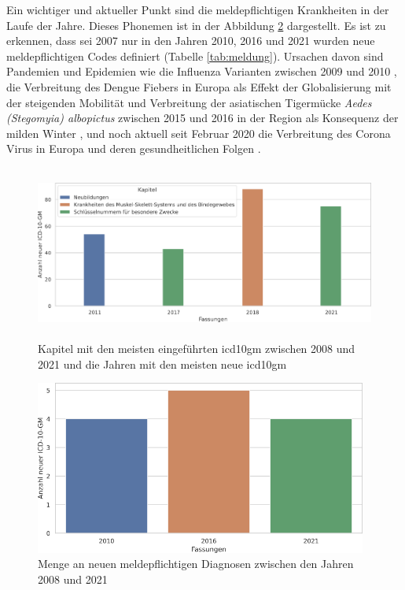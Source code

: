 Ein wichtiger und aktueller Punkt sind die meldepflichtigen Krankheiten in der Laufe der Jahre. Dieses Phonemen ist in der Abbildung \ref{fig:newicdmeld} dargestellt. Es ist zu erkennen, dass sei 2007 nur in den Jahren 2010, 2016 und 2021 wurden neue meldepflichtigen Codes definiert (Tabelle \ref{tab:meldung}). Ursachen davon sind Pandemien und Epidemien wie die Influenza Varianten zwischen 2009 und 2010 \cite{influenza1, influenza2}, die Verbreitung des Dengue Fiebers in Europa als Effekt der Globalisierung mit der steigenden Mobilität \cite{denge1} und Verbreitung der asiatischen Tigermücke \textsl{Aedes (Stegomyia) albopictus} zwischen 2015 und 2016 in der Region als Konsequenz der milden Winter \cite{denge2}, und noch aktuell seit Februar 2020 die Verbreitung des Corona Virus in Europa \cite{corona1} und deren gesundheitlichen Folgen \cite{corona2}.

\clearpage

\begin{figure}[ht]
	\centering
	\includegraphics[height=5.7cm]{figures/kaptnrYear}
	\caption[Kapitel mit den meisten eingeführten \acs{icd10gm} (2008 - 2021)]{Kapitel mit den meisten eingeführten \ac{icd10gm} zwischen 2008 und 2021 und die Jahren mit den meisten neue \ac{icd10gm}}
	\label{fig:newicdcap}
\end{figure} 



\begin{figure}[ht]
	\centering
	\includegraphics[height=5.7cm]{figures/arztJaYear}
	\caption[Meldepflichtige \acs{icd10gm} pro Jahr]{Menge an neuen meldepflichtigen Diagnosen zwischen den Jahren 2008 und 2021}
	\label{fig:newicdmeld}
\end{figure} 

